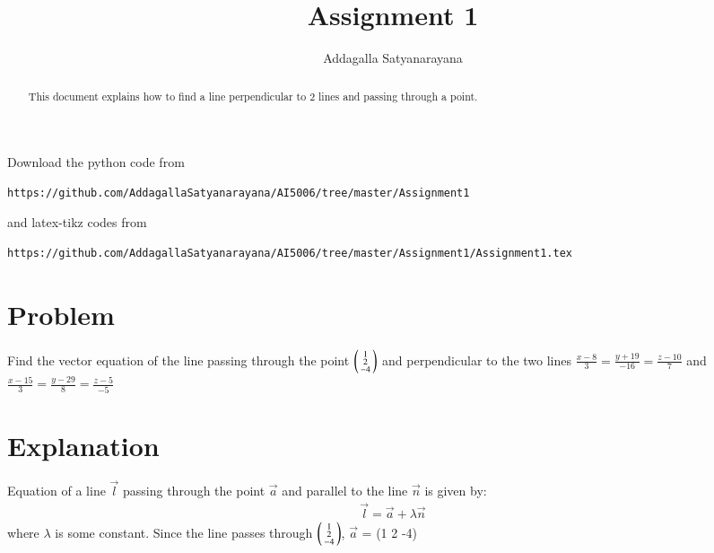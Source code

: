 \documentclass[journal,12pt,twocolumn]{IEEEtran}
\begin{document}
\renewcommand{\thefigure}{\theproblem}
\def\putbox#1#2#3{\makebox[0in][l]{\makebox[#1][l]{}\raisebox{\baselineskip}[0in][0in]{\raisebox{#2}[0in][0in]{#3}}}}
     \def\rightbox#1{\makebox[0in][r]{#1}}
     \def\centbox#1{\makebox[0in]{#1}}
     \def\topbox#1{\raisebox{-\baselineskip}[0in][0in]{#1}}
     \def\midbox#1{\raisebox{-0.5\baselineskip}[0in][0in]{#1}}
\vspace{3cm}
\title{Assignment 1}
\author{Addagalla Satyanarayana}
\maketitle
\newpage
\bigskip
\renewcommand{\thefigure}{\theenumi}
\renewcommand{\thetable}{\theenumi}
\begin{abstract}
This document explains how to find a line perpendicular to 2 lines and passing through a point.
\end{abstract}
Download the python code from 
%
\begin{lstlisting}
https://github.com/AddagallaSatyanarayana/AI5006/tree/master/Assignment1
\end{lstlisting}
%
and latex-tikz codes from 
%
\begin{lstlisting}
https://github.com/AddagallaSatyanarayana/AI5006/tree/master/Assignment1/Assignment1.tex
\end{lstlisting}
%
\section{Problem}
Find the vector equation of the line passing through the point
$\begin{psmallmatrix}1 \\2 \\-4	\end{psmallmatrix}$
and perpendicular to the two lines
   	$\frac{x-8}{3} = \frac{y+19}{-16}= \frac{z-10}{7}$  and
	$\frac{x-15}{3} = \frac{y-29}{8}= \frac{z-5}{-5}$
	
	
\section{Explanation}
Equation of a line $\vec{l}$ passing through the point $\vec{a}$ and parallel to the line $\vec{n}$ is given by:
\begin{align}
 \vec{l} =\vec{a} + \lambda\vec{n} 
\end{align}
where $\lambda$ is some constant.
Since the line passes through 
	$\begin{psmallmatrix}1 \\2\\-4\end{psmallmatrix} $,
$\vec{a}$ = (1  2 -4)
\end{document}
